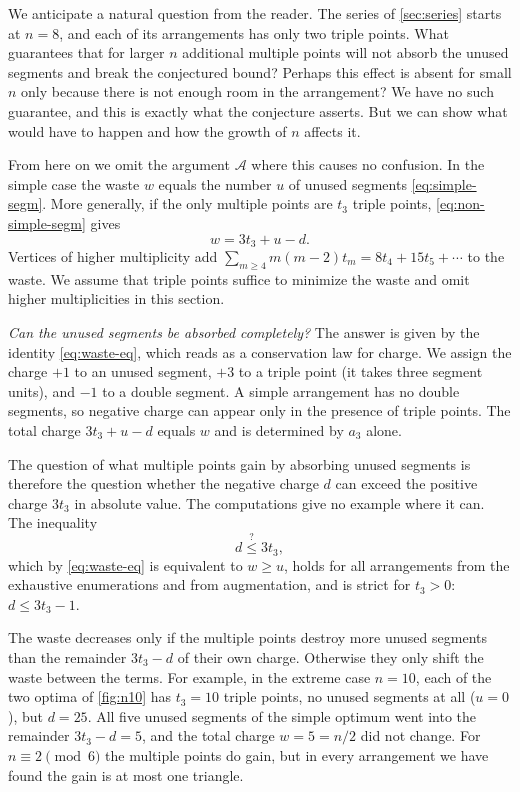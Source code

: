 We anticipate a natural question from the reader. The series of \cref{sec:series} starts at $n=8$, and each of its arrangements has only two triple points. What guarantees that for larger $n$ additional multiple points will not absorb the unused segments and break the conjectured bound? Perhaps this effect is absent for small $n$ only because there is not enough room in the arrangement? We have no such guarantee, and this is exactly what the conjecture asserts. But we can show what would have to happen and how the growth of $n$ affects it.

From here on we omit the argument $\mathcal{A}$ where this causes no confusion. In the simple case the waste $w$ equals the number $u$ of unused segments \eqref{eq:simple-segm}. More generally, if the only multiple points are $t_3$ triple points, \eqref{eq:non-simple-segm} gives
\begin{equation}\label{eq:waste-eq}
w=3t_3+u-d.
\end{equation}
Vertices of higher multiplicity add $\sum_{m\ge4}m(m-2)t_m=8t_4+15t_5+\cdots$ to the waste. We assume that triple points suffice to minimize the waste and omit higher multiplicities in this section.

\emph{Can the unused segments be absorbed completely?} The answer is given by the identity \eqref{eq:waste-eq}, which reads as a conservation law for charge. We assign the charge $+1$ to an unused segment, $+3$ to a triple point (it takes three segment units), and $-1$ to a double segment. A simple arrangement has no double segments, so negative charge can appear only in the presence of triple points. The total charge $3t_3+u-d$ equals $w$ and is determined by $a_3$ alone.

The question of what multiple points gain by absorbing unused segments is therefore the question whether the negative charge $d$ can exceed the positive charge $3t_3$ in absolute value. The computations give no example where it can. The inequality
\begin{equation}\label{eq:compensation}
d\overset{?}{\le}3t_3,
\end{equation}
which by \eqref{eq:waste-eq} is equivalent to $w\ge u$, holds for all arrangements from the exhaustive enumerations and from augmentation, and is strict for $t_3>0$: $d\le3t_3-1$.

The waste decreases only if the multiple points destroy more unused segments than the remainder $3t_3-d$ of their own charge. Otherwise they only shift the waste between the terms. For example, in the extreme case $n=10$, each of the two optima of \cref{fig:n10} has $t_3=10$ triple points, no unused segments at all ($u=0$), but $d=25$. All five unused segments of the simple optimum went into the remainder $3t_3-d=5$, and the total charge $w=5=n/2$ did not change. For $n\equiv2\pmod6$ the multiple points do gain, but in every arrangement we have found the gain is at most one triangle.

